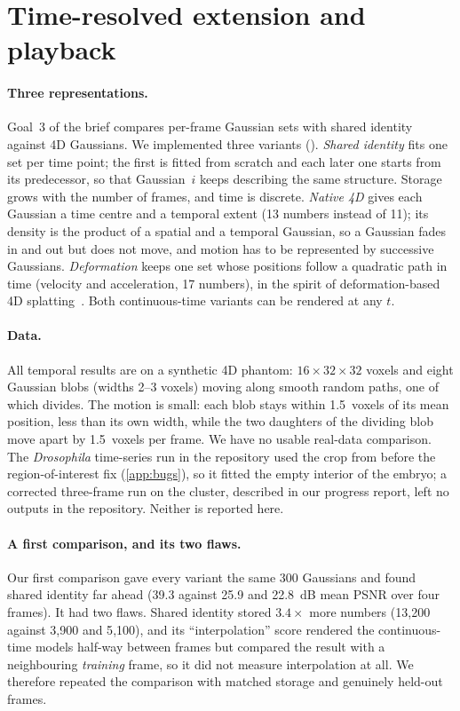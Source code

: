 \documentclass[
  paper=a4,
  fontsize=11pt,
  english,
  numbers=noenddot,
  parskip=half,
  cdgeometry=symmetric,
  cd=barcolor,
  cdfont=false
]{tudscrartcl}
\begin{document}
\section{Time-resolved extension and playback}\label{sec:temporal}

\paragraph{Three representations.} Goal~3 of the brief compares per-frame Gaussian sets with
shared identity against 4D Gaussians. We implemented three variants
(). \emph{Shared identity} fits one set per time point; the first is
fitted from scratch and each later one starts from its predecessor, so that Gaussian~$i$ keeps
describing the same structure. Storage grows with the number of frames, and time is discrete.
\emph{Native 4D} gives each Gaussian a time centre and a temporal extent (13 numbers instead of
11); its density is the product of a spatial and a temporal Gaussian, so a Gaussian fades in and
out but does not move, and motion has to be represented by successive Gaussians.
\emph{Deformation} keeps one set whose positions follow a quadratic path in time (velocity and
acceleration, 17 numbers), in the spirit of deformation-based 4D splatting~\cite{wu2024fourd}.
Both continuous-time variants can be rendered at any $t$.

\paragraph{Data.} All temporal results are on a synthetic 4D phantom: $16\times32\times32$
voxels and eight Gaussian blobs (widths 2--3 voxels) moving along smooth random paths, one of
which divides. The motion is small: each blob stays within 1.5~voxels of its mean position,
less than its own width, while the two daughters of the dividing blob move apart by 1.5~voxels
per frame. We have no usable
real-data comparison. The \emph{Drosophila} time-series run in the repository used the crop
from before the region-of-interest fix (\cref{app:bugs}), so it fitted the empty interior of the
embryo; a corrected three-frame run on the cluster, described in our progress report, left no
outputs in the repository. Neither is reported here.

\paragraph{A first comparison, and its two flaws.} Our first comparison gave every variant the
same 300 Gaussians and found shared identity far ahead (39.3 against 25.9 and \SI{22.8}{dB}
mean PSNR over four frames). It had two flaws. Shared identity stored $3.4\times$ more numbers
(13{,}200 against 3{,}900 and 5{,}100), and its ``interpolation'' score rendered the
continuous-time models half-way between frames but compared the result with a neighbouring
\emph{training} frame, so it did not measure interpolation at all. We therefore repeated the
comparison with matched storage and genuinely held-out frames.
\end{document}

